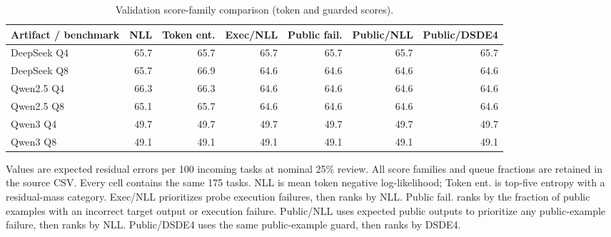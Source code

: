 \begin{table}[htbp]
\centering
\caption{Validation score-family comparison (token and guarded scores).}
\label{tab:scores-validation-2}
\footnotesize
\begin{tabular}{lrrrrrr}
\toprule
Artifact / benchmark & NLL & Token ent. & Exec/NLL & Public fail. & Public/NLL & Public/DSDE4 \\
\midrule
DeepSeek Q4 & 65.7 & 65.7 & 65.7 & 65.7 & 65.7 & 65.7 \\
DeepSeek Q8 & 65.7 & 66.9 & 64.6 & 64.6 & 64.6 & 64.6 \\
Qwen2.5 Q4 & 66.3 & 66.3 & 64.6 & 64.6 & 64.6 & 64.6 \\
Qwen2.5 Q8 & 65.1 & 65.7 & 64.6 & 64.6 & 64.6 & 64.6 \\
Qwen3 Q4 & 49.7 & 49.7 & 49.7 & 49.7 & 49.7 & 49.7 \\
Qwen3 Q8 & 49.1 & 49.1 & 49.1 & 49.1 & 49.1 & 49.1 \\
\bottomrule
\end{tabular}
\par\vspace{4pt}\begin{minipage}{0.98\linewidth}\footnotesize Values are expected residual errors per 100 incoming tasks at nominal 25\% review. All score families and queue fractions are retained in the source CSV. Every cell contains the same 175 tasks. NLL is mean token negative log-likelihood; Token ent. is top-five entropy with a residual-mass category. Exec/NLL prioritizes probe execution failures, then ranks by NLL. Public fail. ranks by the fraction of public examples with an incorrect target output or execution failure. Public/NLL uses expected public outputs to prioritize any public-example failure, then ranks by NLL. Public/DSDE4 uses the same public-example guard, then ranks by DSDE4.\end{minipage}
\end{table}
